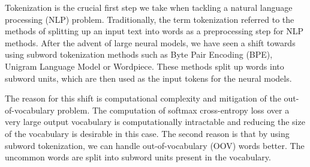 





Tokenization is the crucial first step we take when tackling a natural language processing (NLP) problem. Traditionally, the term tokenization referred to the methods of splitting up an input text into words as a preprocessing step for NLP methods. After the advent of large neural models, we have seen a shift towards using subword tokenization methods such as Byte Pair Encoding (BPE), Unigram Language Model or Wordpiece. These methods split up words into subword units, which are then used as the input tokens for the neural models.

The reason for this shift is computational complexity and mitigation of the out-of-vocabulary problem. The computation of softmax cross-entropy loss over a very large output vocabulary is computationally intractable and reducing the size of the vocabulary is desirable in this case. The second reason is that by using subword tokenization, we can handle out-of-vocabulary (OOV) words better. The uncommon words are split into subword units present in the vocabulary.

